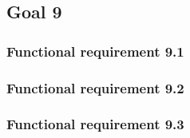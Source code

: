\subsection{Goal 9}

\setcounter{secnumdepth}{3}
\subsubsection{Functional requirement 9.1}

\subsubsection{Functional requirement 9.2}

\subsubsection{Functional requirement 9.3}
